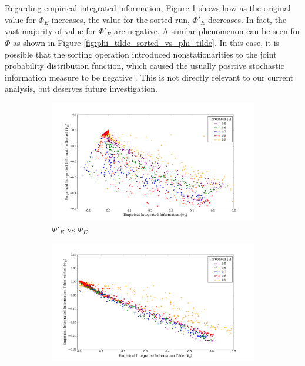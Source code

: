 \documentclass[a4paper,11pt]{article}
\begin{document}
Regarding empirical integrated information, Figure \ref{fig:phi_sorted_vs_phi} shows how as the original value for $\Phi_E$ increases, the value for the sorted run, $\Phi'_E$ decreases. In fact, the vast majority of value for $\Phi'_E$ are negative. A similar phenomenon can be seen for $\widetilde{\Phi}$ as shown in Figure \ref{fig:phi_tilde_sorted_vs_phi_tilde}. In this case, it is possible that the sorting operation introduced nonstationarities to the joint probability distribution function, which caused the usually positive stochastic information measure to be negative \cite{Barrett2011}. This is not directly relevant to our current analysis, but deserves future investigation.

\begin{figure}[H] 
	\label{fig:phi-vs-phi-sorted} 
	\begin{minipage}[b]{0.5\linewidth}
		\begin{figure}[H]
		\begin{center}
		\includegraphics[scale = 0.2]{figures/phi_sorted_vs_phi}
		\caption{
			$\Phi'_E$ vs $\Phi_E$.
			\label{fig:phi_sorted_vs_phi}
		}
		\end{center}
		\end{figure}
		\vspace{2ex}
	\end{minipage}
	\begin{minipage}[b]{0.5\linewidth}
		\begin{figure}[H]
		\begin{center}
		\includegraphics[scale = 0.2]{figures/phi_tilde_sorted_vs_phi_tilde}

\end{center}
\end{figure}
\end{minipage}
\end{figure}
\end{document}
